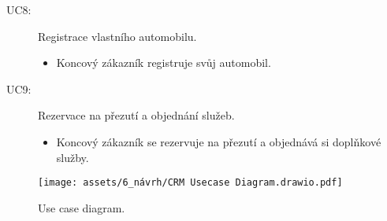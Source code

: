 \begin{description}
\begin{itemize}
    \end{itemize}
    \item [UC8:] Registrace vlastního automobilu.
    \begin{itemize}
        \item Koncový zákazník registruje svůj automobil. 
    \end{itemize}
    \item [UC9:] Rezervace na přezutí a objednání služeb.
    \begin{itemize}
        \item Koncový zákazník se rezervuje na přezutí a objednává si doplňkové služby.
    \end{itemize}
\end{description}
\begin{figure}[h!]
    \centering
    \texttt{[image: assets/6\_návrh/CRM Usecase Diagram.drawio.pdf]}
    \caption{Use case diagram.}
    \label{fig:Use_case_diagram}
\end{figure}
\FloatBarrier
